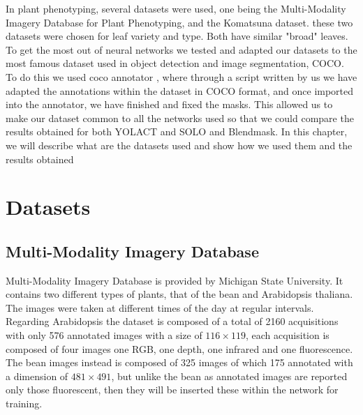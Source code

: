 

In plant phenotyping, several datasets were used, one being the Multi-Modality Imagery Database for Plant Phenotyping, and the
Komatsuna dataset. these two datasets were chosen for leaf variety and type. Both have similar "broad" leaves. To get the most out of neural networks we tested and
adapted our datasets to the most famous dataset used in object detection and image segmentation, COCO. To do this we used coco annotator \cite{cocoannotator}, where through
a script written by us we have adapted the annotations within the dataset in COCO format, and once imported into the annotator, we have finished and fixed the masks.
This allowed us to make our dataset common to all the networks used so that we could compare the results obtained for both YOLACT and SOLO and Blendmask.
In this chapter, we will describe what are the datasets used and show how we used them and the results obtained

\section{Datasets}
\subsection{Multi-Modality Imagery Database}
Multi-Modality Imagery Database is provided by Michigan State University. It contains two different types of plants, that of the bean and Arabidopsis thaliana.
The images were taken at different times of the day at regular intervals. Regarding Arabidopsis the dataset is composed of a total of 2160 acquisitions with only
576 annotated images with a size of $116\times 119$, each acquisition is composed of four images one RGB, one depth, one infrared and one fluorescence. The bean
images instead is composed of 325 images of which 175 annotated with a dimension of $481\times 491$, but unlike the bean as annotated images are reported only those
fluorescent, then they will be inserted these within the network for training.

